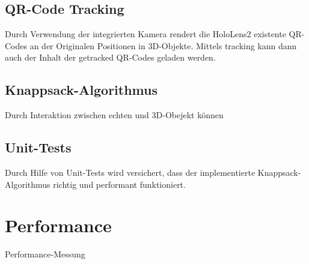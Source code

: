 \subsection{QR-Code Tracking}
Durch Verwendung der integrierten Kamera rendert die HoloLens2 existente QR-Codes an
der Originalen Positionen in 3D-Objekte. Mittels tracking kann dann auch der Inhalt
der getracked QR-Codes geladen werden.

\subsection{Knappsack-Algorithmus}
Durch Interaktion zwischen echten und 3D-Obejekt können

\subsection{Unit-Tests}
Durch Hilfe von Unit-Tests wird versichert, dass der implementierte Knappsack-Algorithmus
richtig und performant funktioniert.

\section{Performance}
Performance-Messung




